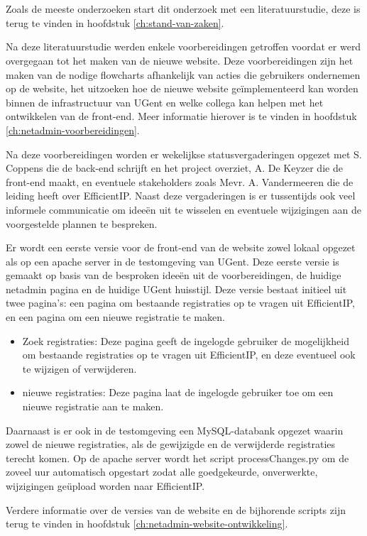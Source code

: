 
\chapter{}%
\label{ch:methodologie}
Zoals de meeste onderzoeken start dit onderzoek met een literatuurstudie, deze is terug te vinden in hoofdstuk \ref{ch:stand-van-zaken}.

Na deze literatuurstudie werden enkele voorbereidingen getroffen voordat er werd overgegaan tot het maken van de nieuwe website.
Deze voorbereidingen zijn het maken van de nodige flowcharts afhankelijk van acties die gebruikers ondernemen op de website, het uitzoeken hoe de nieuwe website geïmplementeerd kan worden binnen de infrastructuur van UGent en welke collega kan helpen met het ontwikkelen van de front-end.
Meer informatie hierover is te vinden in hoofdstuk \ref{ch:netadmin-voorbereidingen}.

Na deze voorbereidingen worden er wekelijkse statusvergaderingen opgezet met S. Coppens die de back-end schrijft en het project overziet, A. De Keyzer die de front-end maakt, en eventuele stakeholders zoals Mevr. A. Vandermeeren die de leiding heeft over EfficientIP.
Naast deze vergaderingen is er tussentijds ook veel informele communicatie om ideeën uit te wisselen en eventuele wijzigingen aan de voorgestelde plannen te bespreken.

Er wordt een eerste versie voor de front-end van de website zowel lokaal opgezet als op een apache server in de testomgeving van UGent. 
Deze eerste versie is gemaakt op basis van de besproken ideeën uit de voorbereidingen, de huidige netadmin pagina en de huidige UGent huisstijl.
Deze versie bestaat initieel uit twee pagina's: een pagina om bestaande registraties op te vragen uit EfficientIP, en een pagina om een nieuwe registratie te maken.
\begin{itemize}
    \item Zoek registraties: Deze pagina geeft de ingelogde gebruiker de mogelijkheid om bestaande registraties op te vragen uit EfficientIP, en deze eventueel ook te wijzigen of verwijderen.
    \item nieuwe registraties: Deze pagina laat de ingelogde gebruiker toe om een nieuwe registratie aan te maken.
\end{itemize}

Daarnaast is er ook in de testomgeving een MySQL-databank opgezet waarin zowel de nieuwe registraties, als de gewijzigde en de verwijderde registraties terecht komen. 
Op de apache server wordt het script processChanges.py om de zoveel uur automatisch opgestart zodat alle goedgekeurde, onverwerkte, wijzigingen geüpload worden naar EfficientIP.

Verdere informatie over de versies van de website en de bijhorende scripts zijn terug te vinden in hoofdstuk \ref{ch:netadmin-website-ontwikkeling}.